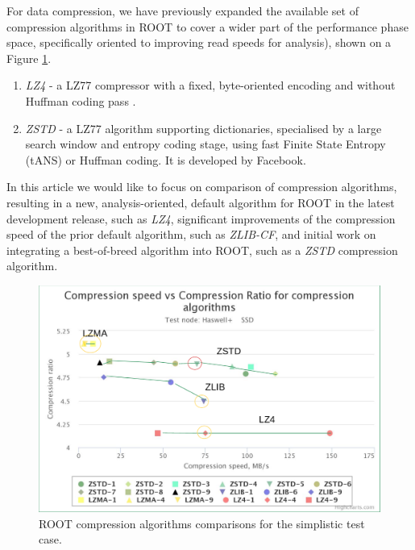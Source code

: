 \documentclass[12pt]{iopart}
\begin{document}

For data compression, we have previously expanded the available set of compression algorithms in ROOT to cover a wider part of the performance phase space, specifically oriented to improving read speeds for analysis), shown on a Figure \ref{fig:compression}.
\begin{enumerate}
    \item \textit{LZ4} - a LZ77 compressor with a fixed, byte-oriented encoding and without Huffman coding pass \cite{lz4}.
    \item \textit{ZSTD} - a LZ77 algorithm supporting dictionaries, specialised by a large search window and entropy coding stage, using fast Finite State Entropy (tANS) or Huffman coding. It is developed by Facebook. \cite{zstd}
\end{enumerate}

In this article we would like to focus on comparison of compression algorithms, resulting in a new, analysis-oriented, default algorithm for ROOT in the latest development release, such as \textit{LZ4}, significant improvements of the compression speed of the prior default algorithm, such as \textit{ZLIB-CF}, and initial work on integrating a best-of-breed algorithm into ROOT, such as a \textit{ZSTD} compression algorithm.

\begin{figure}[h]
\centering
\includegraphics[width=0.8\linewidth]{compr.png}
\caption{ROOT compression algorithms comparisons for the  simplistic test case.}
\label{fig:compression}
\end{figure}
\end{document}

